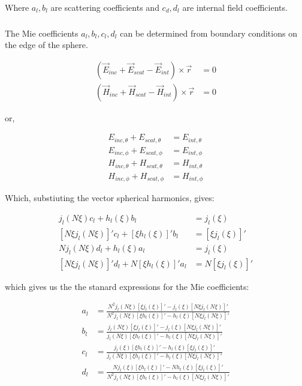             Where $a_l, b_l$ are scattering coefficients and $c_d, d_l$ are internal field coefficients.

        \subsubsection{}

            The Mie coefficients $a_l, b_l, c_l, d_l$ can be determined from boundary conditions on the edge of the sphere.

            \begin{align}
                \left( \vec{E}_{inc} + \vec{E}_{scat} - \vec{E}_{int} \right) \times \vec{r} &= 0 \\
                \left( \vec{H}_{inc} + \vec{H}_{scat} - \vec{H}_{int} \right) \times \vec{r} &= 0
            \end{align}

            or,

            \begin{align}
                E_{inc,\theta} + E_{scat,\theta} &= E_{int, \theta} \\
                E_{inc,\phi} + E_{scat,\phi} &= E_{int, \phi} \\
                H_{inc,\theta} + H_{scat,\theta} &= H_{int, \theta} \\
                H_{inc,\phi} + H_{scat,\phi} &= H_{int, \phi}
            \end{align}

            Which, substiuting the vector spherical harmonics, gives:

            \begin{align}
                j_l(N\xi)c_l + h_l(\xi)b_l&=j_l(\xi)\\
                [N\xi j_l(N\xi)]'c_l+ [\xi h_l(\xi)]'b_l&= [\xi j_l(\xi)]'\\
                Nj_l(N\xi)d_l + h_l(\xi)a_l &= j_l(\xi)\\
                [N\xi j_l(N\xi)]'d_l +N[\xi h_l(\xi)]'a_l &= N[\xi j_l(\xi)]'
            \end{align}

            which gives us the the stanard expressions for the Mie coefficients:

            \begin{align}
                a_l &= \frac{N^2 j_l(N\xi)[\xi j_l(\xi)]' - j_l(\xi)[N\xi j_l(N \xi)]'}{N^2 j_l(N\xi)[\xi h_l(\xi)]' - h_l(\xi)[N\xi j_l(N \xi)]'}\\
                b_l &= \frac{j_l(N\xi)[\xi j_l(\xi)]' - j_l(\xi)[N\xi j_l(N\xi)]'}{j_l(N\xi)[\xi h_l(\xi)]' - h_l(\xi)[N\xi j_l(N\xi)]'}\\
                c_l &= \frac{j_l(\xi)[\xi h_l(\xi)]' - h_l(\xi)[\xi j_l(\xi)]'}{j_l(N\xi)[\xi h_l(\xi)]' - h_l(\xi)[N\xi j_l(N\xi)]'}\\
                d_l &= \frac{Nj_l(\xi)[\xi h_l(\xi)]' - N h_l(\xi)[\xi j_l(\xi)]'}{N^2 j_l(N\xi)[\xi h_l(\xi)]' - h_l(\xi)[N\xi j_l(N\xi)]'}
            \end{align}

